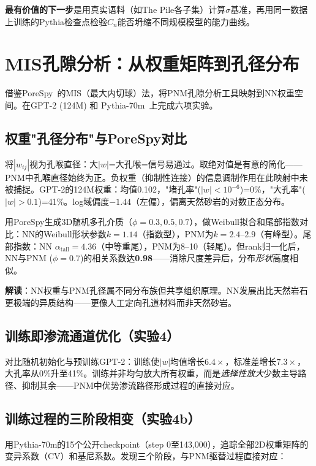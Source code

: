 \documentclass[11pt,a4paper]{article}
\begin{document}
\textbf{最有价值的下一步}是用真实语料（如The Pile各子集）计算$\sigma$基准，再用同一数据上训练的Pythia检查点检验$C_n$能否坍缩不同规模模型的能力曲线。

\section{MIS孔隙分析：从权重矩阵到孔径分布}
\label{sec:mis}

借鉴PoreSpy~\citep{gostick2019porespy}的MIS（最大内切球）法，将PNM孔隙分析工具映射到NN权重空间。在GPT-2 (124M) 和 Pythia-70m~\citep{biderman2023pythia}上完成六项实验。

\subsection{权重"孔径分布"与PoreSpy对比}

将$|w_{ij}|$视为孔喉直径：大$|w|$=大孔喉=信号易通过。取绝对值是有意的简化——PNM中孔喉直径始终为正。负权重（抑制性连接）的信息调制作用在此映射中未被捕捉。GPT-2的124M权重：均值0.102，"堵孔率"($|w|<10^{-6}$)=0\%，"大孔率"($|w|>0.1$)=41\%。log域偏度$-1.44$（左偏），偏离天然砂岩的对数正态分布。

用PoreSpy生成3D随机多孔介质（$\phi=0.3,0.5,0.7$），做Weibull拟合和尾部指数对比：NN的Weibull形状参数$k=1.14$（指数型），PNM为$k=2.4$--$2.9$（有峰型）。尾部指数：NN $\alpha_{\text{tail}}=4.36$（中等重尾），PNM为8--10（轻尾）。但rank归一化后，NN与PNM ($\phi=0.7$)的相关系数达\textbf{0.98}——消除尺度差异后，分布\emph{形状}高度相似。

\textbf{解读}：NN权重与PNM孔径属不同分布族但共享组织原理。NN发展出比天然岩石更极端的异质结构——更像人工定向孔道材料而非天然砂岩。

\subsection{训练即渗流通道优化（实验4）}

对比随机初始化与预训练GPT-2：训练使$|w|$均值增长$6.4\times$，标准差增长$7.3\times$，大孔率从0\%升至41\%。训练并非均匀放大所有权重，而是\emph{选择性放大}少数主导路径、抑制其余——PNM中优势渗流路径形成过程的直接对应。

\subsection{训练过程的三阶段相变（实验4b）}
\label{sec:three-phase}

用Pythia-70m的15个公开checkpoint（step 0至143,000），追踪全部2D权重矩阵的变异系数（CV）和基尼系数。发现三个阶段，与PNM驱替过程直接对应：
\end{document}
